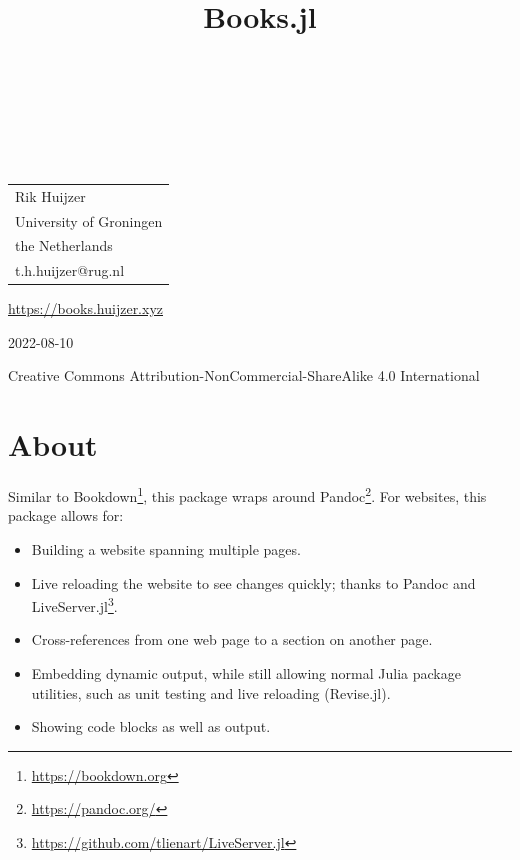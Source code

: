 \documentclass[
  notoc %
]{tufte-book}
\title{Books.jl}
\author{\noindent{Rik Huijzer}\\[3mm] \noindent{and
contributors}\\[3mm] }
\date{}
\DeclareRobustCommand{\href}[2]{#2\footnote{\url{#1}}}
\providecommand{\tightlist}{%
  \setlength{\itemsep}{0pt}\setlength{\parskip}{0pt}
}
\begin{document}
\makeatletter
\thispagestyle{empty}
\vfill
{\Huge\bf
\noindent
\@title
}\\[1in]
{\Large
\noindent
\@author
}
\makeatother

\makeatletter
\newpage
\thispagestyle{empty}
\vfill
{\noindent
\begin{tabular}{l} Rik Huijzer\\ University of Groningen\\ the Netherlands\\ t.h.huijzer@rug.nl\\ \end{tabular}
}
\vfill
{\small
\url{https://books.huijzer.xyz}

2022-08-10

Creative Commons Attribution-NonCommercial-ShareAlike 4.0 International
}
\makeatother


\frontmatter
\mainmatter

\setcounter{tocdepth}{1}
\tableofcontents

\justifying

\setlength{\parindent}{0pt}

\hypertarget{sec:about}{%
\chapter{About}\label{sec:about}}

Similar to \href{https://bookdown.org}{Bookdown}, this package wraps
around \href{https://pandoc.org/}{Pandoc}. For websites, this package
allows for:

\begin{itemize}
\tightlist
\item
  Building a website spanning multiple pages.
\item
  Live reloading the website to see changes quickly; thanks to Pandoc
  and \href{https://github.com/tlienart/LiveServer.jl}{LiveServer.jl}.
\item
  Cross-references from one web page to a section on another page.
\item
  Embedding dynamic output, while still allowing normal Julia package
  utilities, such as unit testing and live reloading (Revise.jl).
\item
  Showing code blocks as well as output.
\end{itemize}
\end{document}
